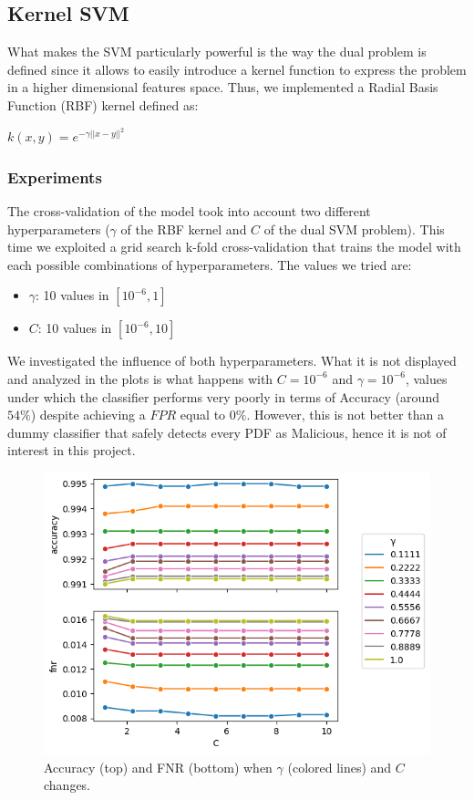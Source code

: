 \documentclass[twocolumn, switch]{article} %
\newcommand\x{0.7}
\begin{document}
\subsection{Kernel SVM}
What makes the SVM particularly powerful is the way the dual problem is defined since it allows to easily introduce a kernel function to express the problem in a higher dimensional features space. Thus, we implemented a Radial Basis Function (RBF) kernel defined as:
\begin{center}
	$k(x,y) = e^{-\gamma||x-y||^2}$
\end{center}

\subsubsection{Experiments}
\label{sub:expsvm}
The cross-validation of the model took into account two different hyperparameters ($\gamma$ of the RBF kernel and $C$ of the dual SVM problem).
This time we exploited a grid search k-fold cross-validation that trains the model with each possible combinations of hyperparameters. The values we tried are:
\begin{itemize}
	\item $\gamma$: 10 values in $[10^{-6}, 1]$
	\item $C$: 10 values in $[10^{-6}, 10]$
\end{itemize}
We investigated the influence of both hyperparameters. What it is not displayed and analyzed in the plots is what happens with $C=10^{-6}$ and $\gamma=10^{-6}$, values under which the classifier performs very poorly in terms of Accuracy (around $54\%$) despite achieving a $FPR$ equal to $0\%$. However, this is not better than a dummy classifier that safely detects every PDF as Malicious, hence it is not of interest in this project.

\begin{figure}[ht!]
	\centering
	\includegraphics[width=\x\linewidth]{rbf_svm_gamma_accuracy_fnr.png}
	\caption{Accuracy (top) and FNR (bottom) when $\gamma$ (colored lines) and $C$ changes.}
	\label{fig:rbfsvmgamma}
\end{figure}
\end{document}
